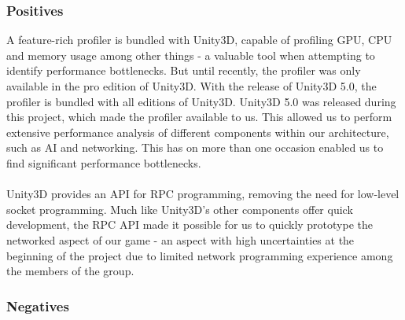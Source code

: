 \subsubsection*{Positives}
A feature-rich profiler is bundled with Unity3D, capable of profiling GPU, CPU
and memory usage among other things - a valuable tool when attempting to
identify performance bottlenecks. But until recently, the profiler was only
available in the pro edition of Unity3D. With the release of Unity3D 5.0, the
profiler is bundled with all editions of Unity3D. Unity3D 5.0 was released
during this project, which made the profiler available to us. This allowed us
to perform extensive performance analysis of different components within our
architecture, such as AI and networking. This has on more than one occasion
enabled us to find significant performance bottlenecks.
\\
\\
Unity3D provides an API for RPC programming, removing the need for low-level
socket programming. Much like Unity3D's other components offer quick
development, the RPC API made it possible for us to quickly prototype the
networked aspect of our game - an aspect with high uncertainties at the
beginning of the project due to limited network programming experience
among the members of the group.

\subsubsection*{Negatives}

